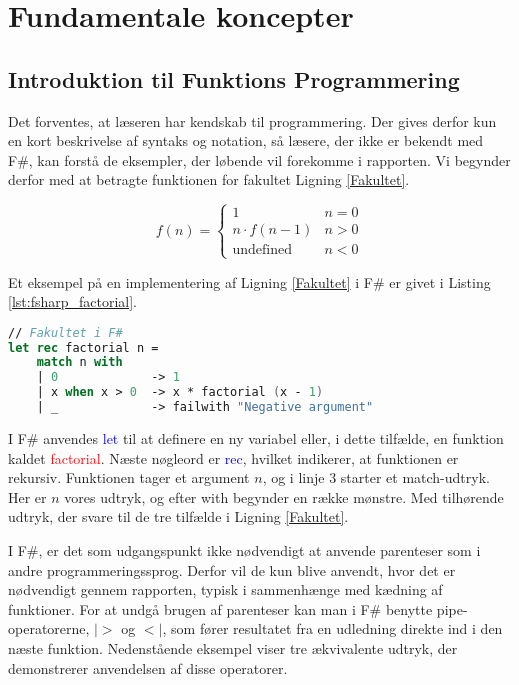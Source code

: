 
\section{Fundamentale koncepter}
\subsection{Introduktion til Funktions Programmering}
Det forventes, at læseren har kendskab til programmering. Der gives derfor kun en kort beskrivelse af syntaks og notation, så læsere, der ikke er bekendt med F\#, kan forstå de eksempler, der løbende vil forekomme i rapporten. Vi begynder derfor med at betragte funktionen for fakultet Ligning \eqref{Fakultet}.

\begin{equation}
    \label{Fakultet}
    f(n) = \begin{cases} 
            1 &  n = 0  \\
            n \cdot f(n-1) & n > 0 \\
            \text{undefined} & n < 0 
           \end{cases}
\end{equation}

Et eksempel på en implementering af Ligning \eqref{Fakultet} i F\# er givet i Listing \ref{lst:fsharp_factorial}.

\begin{lstlisting}[language={FSharp}, label={lst:fsharp_factorial}, caption={Eksempel på Fakultet i F\#}]
// Fakultet i F#
let rec factorial n =
    match n with
    | 0             -> 1 
    | x when x > 0  -> x * factorial (x - 1)
    | _             -> failwith "Negative argument"
\end{lstlisting}

I F\# anvendes \textcolor{blue}{let} til at definere en ny variabel eller, i dette tilfælde, en funktion kaldet \textcolor{red}{factorial}. Næste nøgleord er \textcolor{blue}{rec}, hvilket indikerer, at funktionen er rekursiv. Funktionen tager et argument \(n\), og i linje 3 starter et match-udtryk. Her er \(n\) vores udtryk, og efter \textcolor{codepurple}{with} begynder en række mønstre. Med tilhørende udtryk, der svare til de tre tilfælde i Ligning \eqref{Fakultet}. 
    
I F\#, er det som udgangspunkt ikke nødvendigt at anvende parenteser som i andre programmeringssprog. Derfor vil de kun blive anvendt, hvor det er nødvendigt gennem rapporten, typisk i sammenhænge med kædning af funktioner. For at undgå brugen af parenteser kan man i F\# benytte pipe-operatorerne, $|>$ og $<|$, som fører resultatet fra en udledning direkte ind i den næste funktion. Nedenstående eksempel viser tre ækvivalente udtryk, der demonstrerer anvendelsen af disse operatorer.

